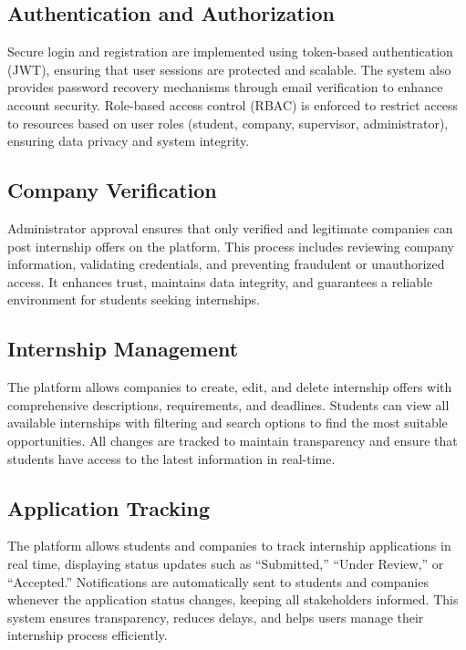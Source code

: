 \documentclass[11pt,a4paper]{article}
\begin{document}
\subsection{Authentication and Authorization}

Secure login and registration are implemented using token-based authentication (JWT), ensuring that user sessions are protected and scalable. The system also provides password recovery mechanisms through email verification to enhance account security. Role-based access control (RBAC) is enforced to restrict access to resources based on user roles (student, company, supervisor, administrator), ensuring data privacy and system integrity.

\subsection{Company Verification}

Administrator approval ensures that only verified and legitimate companies can post internship offers on the platform. This process includes reviewing company information, validating credentials, and preventing fraudulent or unauthorized access. It enhances trust, maintains data integrity, and guarantees a reliable environment for students seeking internships.

\subsection{Internship Management}

The platform allows companies to create, edit, and delete internship offers with comprehensive descriptions, requirements, and deadlines. Students can view all available internships with filtering and search options to find the most suitable opportunities. All changes are tracked to maintain transparency and ensure that students have access to the latest information in real-time.

\subsection{Application Tracking}

The platform allows students and companies to track internship applications in real time, displaying status updates such as “Submitted,” “Under Review,” or “Accepted.” Notifications are automatically sent to students and companies whenever the application status changes, keeping all stakeholders informed. This system ensures transparency, reduces delays, and helps users manage their internship process efficiently.
\end{document}
